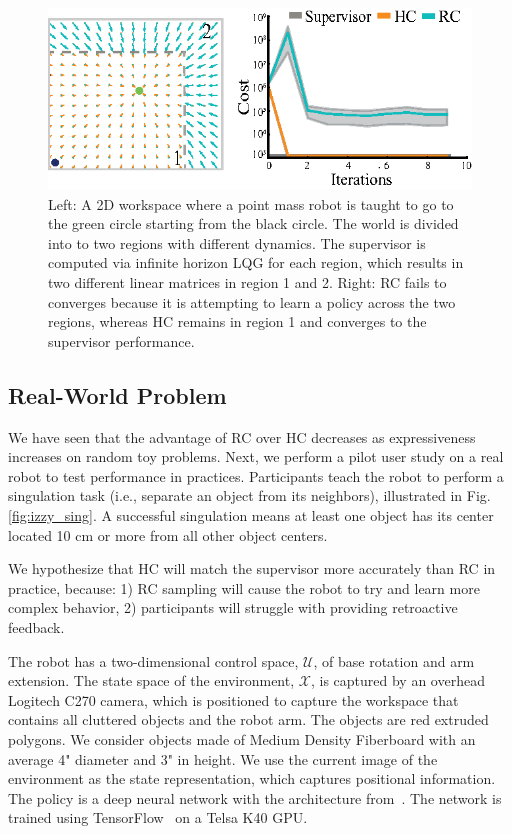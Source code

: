 \documentclass[10pt, conference]{ieeeconf}      %
\begin{document}
\begin{figure}
\centering
\includegraphics{f_figs/p_mass.eps}
\caption{
    \footnotesize
Left: A 2D workspace where a point mass robot is taught to go to the green circle starting from the black circle. The world is divided into to two regions with different dynamics. The supervisor is computed via infinite horizon LQG for each region, which results in two different linear matrices in region 1 and 2. Right: RC fails to converges because it is attempting to learn a policy across the two regions, whereas HC remains in region 1 and converges to the supervisor performance. }
\vspace*{-20pt}
\label{fig:p_mass}
\end{figure}

 \subsection{Real-World Problem}
We have seen that the advantage of RC over HC decreases as expressiveness increases on random toy problems. Next, we perform a pilot user study on a real robot to test performance in practices.
Participants teach the robot to perform a singulation task (i.e., separate an object from its neighbors), illustrated in Fig. \ref{fig:izzy_sing}. A successful singulation means at least one object has its center located 10 cm or more from all other object centers. 

We hypothesize that HC will match the supervisor more accurately than RC in practice, because: 1)
RC sampling will cause the robot to try and learn more
complex behavior, 2) participants will struggle with providing
retroactive feedback.

The robot has a two-dimensional control space, $\mathcal{U}$, of base rotation and arm extension. The state space of the environment, $\mathcal{X}$, is captured by an overhead Logitech C270 camera, which is positioned to capture the workspace that contains all cluttered objects and the robot arm.  The objects are red extruded polygons. We consider objects made of Medium Density Fiberboard with an average 4" diameter and 3" in height.  We use the current image of the environment as the state representation, which captures positional information. The policy is a deep neural network with the architecture from~\cite{laskeyrobot}. The network is trained using TensorFlow~\cite{tensor} on a Telsa K40 GPU. 
\end{document}
